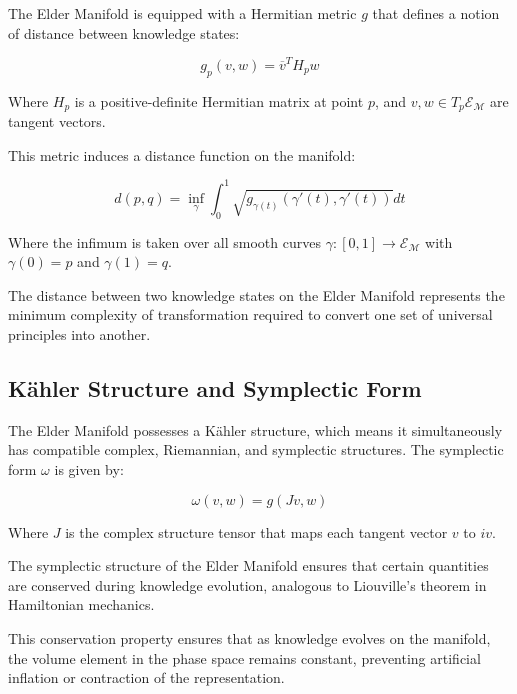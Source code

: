 The Elder Manifold is equipped with a Hermitian metric $g$ that defines a notion of distance between knowledge states:

\begin{equation}
g_p(v, w) = \overline{v}^T H_p w
\end{equation}

Where $H_p$ is a positive-definite Hermitian matrix at point $p$, and $v, w \in T_p\mathcal{E}_{\mathcal{M}}$ are tangent vectors.

This metric induces a distance function on the manifold:

\begin{equation}
d(p, q) = \inf_{\gamma} \int_0^1 \sqrt{g_{\gamma(t)}(\gamma'(t), \gamma'(t))} dt
\end{equation}

Where the infimum is taken over all smooth curves $\gamma: [0,1] \rightarrow \mathcal{E}_{\mathcal{M}}$ with $\gamma(0) = p$ and $\gamma(1) = q$.

\begin{proposition}
The distance between two knowledge states on the Elder Manifold represents the minimum complexity of transformation required to convert one set of universal principles into another.
\end{proposition}

\subsection{Kähler Structure and Symplectic Form}

The Elder Manifold possesses a Kähler structure, which means it simultaneously has compatible complex, Riemannian, and symplectic structures. The symplectic form $\omega$ is given by:

\begin{equation}
\omega(v, w) = g(Jv, w)
\end{equation}

Where $J$ is the complex structure tensor that maps each tangent vector $v$ to $iv$.

\begin{theorem}
The symplectic structure of the Elder Manifold ensures that certain quantities are conserved during knowledge evolution, analogous to Liouville's theorem in Hamiltonian mechanics.
\end{theorem}

This conservation property ensures that as knowledge evolves on the manifold, the volume element in the phase space remains constant, preventing artificial inflation or contraction of the representation.

